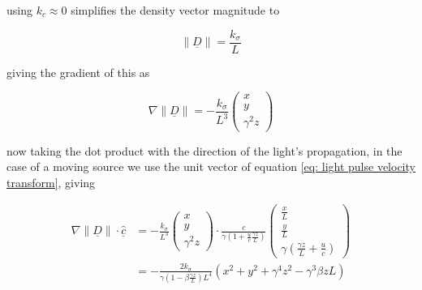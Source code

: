 \begin{derivation}

	using $k_c \approx 0$ simplifies the density vector magnitude to

	\begin{equation}
		\| \underline{D} \| = \frac{k_\sigma}{L}
	\end{equation}

	giving the gradient of this as

	\begin{equation}
		\nabla \| \underline{D} \| = -\frac{k_\sigma}{L^3}
		\begin{pmatrix}
			x \\
			y \\
			\gamma^2 z
		\end{pmatrix}
	\end{equation}

	now taking the dot product with the direction of the light's propagation, in the case of a moving source we use the unit vector of equation \eqref{eq: light pulse velocity transform}, giving

	\begin{equation}
		\begin{aligned}
		\nabla \| \underline{D} \| \cdot \underline{\hat{c}}
		& = -\frac{k_\sigma}{L^3}
		\begin{pmatrix}
			x \\
			y \\
			\gamma^2 z
		\end{pmatrix}
		\cdot
		\frac{c}{ \gamma \left( 1 + \frac{u}{c} \frac{\gamma {z}}{L} \right) }
		\begin{pmatrix}
			\frac{{x}}{L} \\
			\frac{{y}}{L} \\
			\gamma \left( \frac{\gamma {z}}{L} + \frac{u}{c} \right)
		\end{pmatrix} \\
		& = -\frac{2k_\sigma}{\gamma\left(1-\beta\frac{\gamma z}{L}\right)L^4} \left( x^2 + y^2 + \gamma^4 z^2 - \gamma^3 \beta z L \right)
	\end{aligned}
	\end{equation}

\end{derivation}






